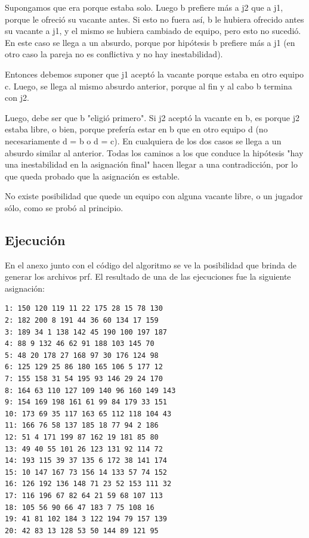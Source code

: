 \documentclass[article,a4paper]{article}
\begin{document}
Supongamos que era porque estaba solo. Luego b prefiere más a j2 que a j1, porque le ofreció su vacante antes. Si esto no fuera así, b le hubiera ofrecido antes su vacante a j1, y el mismo se hubiera cambiado de equipo, pero esto no sucedió. En este caso se llega a un absurdo, porque por hipótesis b prefiere más a j1 (en otro caso la pareja no es conflictiva y no hay inestabilidad).

Entonces debemos suponer que j1 aceptó la vacante porque estaba en otro equipo c. Luego, se llega al mismo absurdo anterior, porque al fin y al cabo b termina con j2.

Luego, debe ser que b "eligió primero". Si j2 aceptó la vacante en b, es porque j2 estaba libre, o bien, porque prefería estar en b que en otro equipo d (no necesariamente d = b o d = c). En cualquiera de los dos casos se llega a un absurdo similar al anterior.
Todas los caminos a los que conduce la hipótesis "hay una inestabilidad en la asignación final" hacen llegar a una contradicción, por lo que queda probado que la asignación es estable.

No existe posibilidad que quede un equipo con alguna vacante libre, o un jugador sólo, como se probó al principio.

\subsection{Ejecución}
En el anexo junto con el código del algoritmo se ve la posibilidad que brinda de generar los archivos prf. El resultado de una de las ejecuciones fue la siguiente asignación: 

\begin{verbatim}
1: 150 120 119 11 22 175 28 15 78 130
2: 182 200 8 191 44 36 60 134 17 159
3: 189 34 1 138 142 45 190 100 197 187
4: 88 9 132 46 62 91 188 103 145 70
5: 48 20 178 27 168 97 30 176 124 98
6: 125 129 25 86 180 165 106 5 177 12
7: 155 158 31 54 195 93 146 29 24 170
8: 164 63 110 127 109 140 96 160 149 143
9: 154 169 198 161 61 99 84 179 33 151
10: 173 69 35 117 163 65 112 118 104 43
11: 166 76 58 137 185 18 77 94 2 186
12: 51 4 171 199 87 162 19 181 85 80
13: 49 40 55 101 26 123 131 92 114 72
14: 193 115 39 37 135 6 172 38 141 174
15: 10 147 167 73 156 14 133 57 74 152
16: 126 192 136 148 71 23 52 153 111 32
17: 116 196 67 82 64 21 59 68 107 113
18: 105 56 90 66 47 183 7 75 108 16
19: 41 81 102 184 3 122 194 79 157 139
20: 42 83 13 128 53 50 144 89 121 95
\end{verbatim}


\appendix
\end{document}
